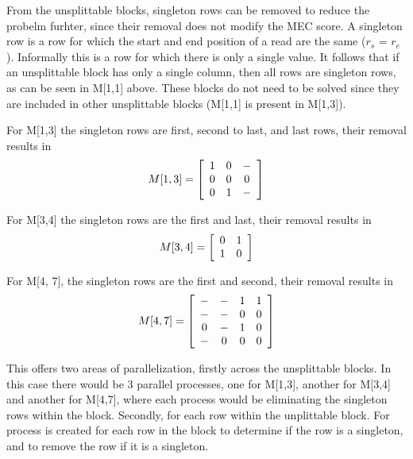\documentclass[10pt,twocolumn]{article}
\begin{document}
From the unsplittable blocks, singleton rows can be removed to reduce the probelm furhter, since their removal
does not modify the MEC score. A singleton row is a row for which the start and end position of a read are the
same ($r_s$ = $r_e$). Informally this is a row for which there is only a single value. It follows that if an
unsplittable block has only a single column, then all rows are singleton rows, as can be seen in M[1,1] above.
These blocks do not need to be solved since they are included in other unsplittable blocks (M[1,1] is present
in M[1,3]).

For M[1,3] the singleton rows are first, second to last, and last rows, their removal results in
\begin{equation*}
    M[1,3] = \left[ \begin{array}{c c c}
            1   & 0     & -     \\
            0   & 0     & 0     \\
            0   & 1     & - 
    \end{array} \right]
\end{equation*}

For M[3,4] the singleton rows are the first and last, their removal results in 
\begin{equation*}
    M[3,4] = \left[ \begin{array}{c c}
            0   & 1     \\
            1   & 0     
    \end{array} \right]
\end{equation*}

For M[4, 7], the singleton rows are the first and second, their removal results in
\begin{equation*}
    M[4,7] = \left[ \begin{array}{c c c c}
            -   & -     & 1     & 1     \\
            -   & -     & 0     & 0     \\
            0   & -     & 1     & 0     \\
            -   & 0     & 0     & 0     
    \end{array} \right]
\end{equation*}

This offers two areas of parallelization, firstly across the unsplittable blocks. In this case there would be
3 parallel processes, one for M[1,3], another for M[3,4] and another for M[4,7], where each process would be
eliminating the singleton rows within the block. Secondly, for each row within the unplittable block. For
process is created for each row in the block to determine if the row is a singleton, and to remove the row 
if it is a singleton.
\end{document}
